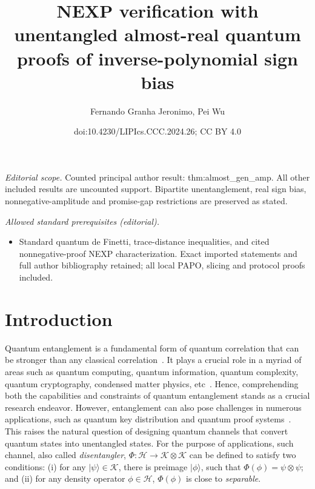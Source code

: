\documentclass[10pt,a4paper]{article}
\title{NEXP verification with unentangled almost-real quantum proofs of inverse-polynomial sign bias}
\author{Fernando Granha Jeronimo, Pei Wu}
\date{doi:10.4230/LIPIcs.CCC.2024.26; CC BY 4.0}
\theoremstyle{remark}
\def\to{\rightarrow}
\newcommand{\cH}{\mathcal{H}}
\newcommand{\1}[1]{\mathds{1}{[#1]}}
\newcommand{\ket}[1]{\lvert #1\rangle}
\newcommand{\cK}{\mathcal{K}}
\numberwithin{equation}{section}
\begin{document}
\maketitle
\noindent\textit{Editorial scope.} Counted principal author result: thm:almost\_gen\_amp. All other included results are uncounted support. Bipartite unentanglement, real sign bias, nonnegative-amplitude and promise-gap restrictions are preserved as stated.\par\medskip
\noindent\textit{Allowed standard prerequisites (editorial).}\begin{itemize}
\item Standard quantum de Finetti, trace-distance inequalities, and cited nonnegative-proof NEXP characterization. Exact imported statements and full author bibliography retained; all local PAPO, slicing and protocol proofs included.
\end{itemize}\medskip
\section{Introduction}

Quantum entanglement is a fundamental form of quantum correlation that
can be stronger than any classical correlation~\cite{EPR35, B64,CHSH69,JNVWY20}.
%
It plays a crucial role in a myriad of areas such as quantum computing, quantum information,
quantum complexity, quantum cryptography, condensed matter physics, etc~\cite{HHHH09,NC10,Watrous18}.
%
Hence, comprehending both the capabilities and constraints of quantum entanglement stands
as a crucial research endeavor.
%
However, entanglement can also pose challenges in numerous applications, such as quantum
key distribution and quantum proof systems~\cite{Renner08,KMY03,OW16,HHJWY17}.
%
This raises the natural question of designing quantum channels that convert quantum states
into unentangled states. 
%
For the purpose of applications, such channel, also called \emph{disentangler}, $\Phi: \cH \to \cK\otimes\cK$ can be defined to satisfy two
conditions: (i) for any $\ket\psi\in\cK$, there is preimage $\ket\phi$, such that $\Phi(\phi)=\psi\otimes\psi$;
and (ii) for any density operator $\phi\in \cH$, $\Phi(\phi)$ is close to \emph{separable}. 
\end{document}
